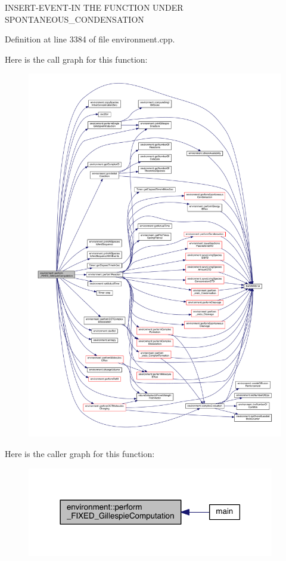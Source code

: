 I\+N\+S\+E\+R\+T-\/\+E\+V\+E\+N\+T-\/\+I\+N T\+H\+E F\+U\+N\+C\+T\+I\+O\+N U\+N\+D\+E\+R S\+P\+O\+N\+T\+A\+N\+E\+O\+U\+S\+\_\+\+C\+O\+N\+D\+E\+N\+S\+A\+T\+I\+O\+N 

Definition at line 3384 of file environment.\+cpp.



Here is the call graph for this function\+:\nopagebreak
\begin{figure}[H]
\begin{center}
\leavevmode
\includegraphics[width=350pt]{a00013_a847f333ec6acea11f2d0fc99bab52586_cgraph}
\end{center}
\end{figure}




Here is the caller graph for this function\+:\nopagebreak
\begin{figure}[H]
\begin{center}
\leavevmode
\includegraphics[width=306pt]{a00013_a847f333ec6acea11f2d0fc99bab52586_icgraph}
\end{center}
\end{figure}


